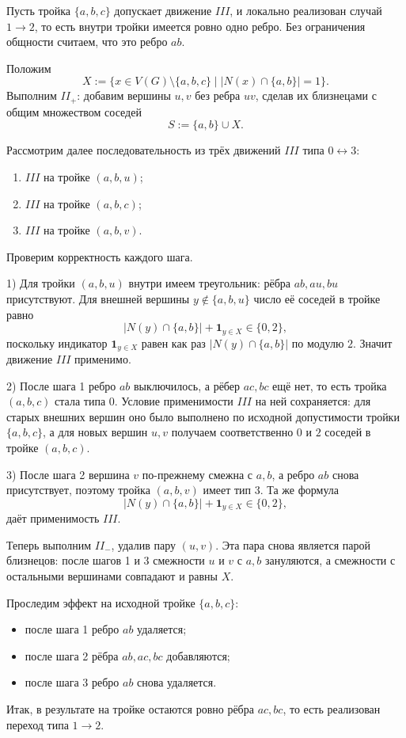 \documentclass[12pt,a4paper]{article}
\begin{document}
Пусть тройка $\{a,b,c\}$ допускает движение $III$, и локально реализован случай $1\to 2$,
то есть внутри тройки имеется ровно одно ребро. Без ограничения общности считаем, что это ребро
$ab$.

Положим
\[
X:=\{x\in V(G)\setminus\{a,b,c\}\mid |N(x)\cap\{a,b\}|=1\}.
\]
Выполним $II_+$: добавим вершины $u,v$ без ребра $uv$, сделав их близнецами с общим
множеством соседей
\[
S:=\{a,b\}\cup X.
\]

Рассмотрим далее последовательность из трёх движений $III$ типа $0\leftrightarrow 3$:
\begin{enumerate}
\item $III$ на тройке $(a,b,u)$;
\item $III$ на тройке $(a,b,c)$;
\item $III$ на тройке $(a,b,v)$.
\end{enumerate}

Проверим корректность каждого шага.

1) Для тройки $(a,b,u)$ внутри имеем треугольник: рёбра $ab,au,bu$ присутствуют.
Для внешней вершины $y\notin\{a,b,u\}$ число её соседей в тройке равно
\[
|N(y)\cap\{a,b\}|+\mathbf 1_{y\in X} \in \{0,2\},
\]
поскольку индикатор $\mathbf 1_{y\in X}$ равен как раз $|N(y)\cap\{a,b\}|$  по модулю $2$. Значит движение $III$ применимо.

2) После шага 1 ребро $ab$ выключилось, а рёбер $ac,bc$ ещё нет, то есть тройка $(a,b,c)$ стала
типа $0$. Условие применимости $III$ на ней сохраняется: для старых внешних вершин оно было
выполнено по исходной допустимости тройки $\{a,b,c\}$, а для новых вершин $u,v$ получаем
соответственно $0$ и $2$ соседей в тройке $(a,b,c)$.

3) После шага 2 вершина $v$ по-прежнему смежна с $a,b$, а ребро $ab$ снова присутствует,
поэтому тройка $(a,b,v)$ имеет тип $3$. Та же формула
\[
|N(y)\cap\{a,b\}|+\mathbf 1_{y\in X} \in \{0,2\},
\]
даёт применимость $III$.

Теперь выполним $II_-$, удалив пару $(u,v)$. Эта пара снова является парой близнецов:
после шагов 1 и 3 смежности $u$ и $v$ с $a,b$ зануляются, а смежности с остальными вершинами
совпадают и равны $X$.

Проследим эффект на исходной тройке $\{a,b,c\}$:
\begin{itemize}
\item после шага 1 ребро $ab$ удаляется;
\item после шага 2 рёбра $ab,ac,bc$ добавляются;
\item после шага 3 ребро $ab$ снова удаляется.
\end{itemize}
Итак, в результате на тройке остаются ровно рёбра $ac,bc$, то есть реализован переход
типа $1\to 2$.
\end{document}
